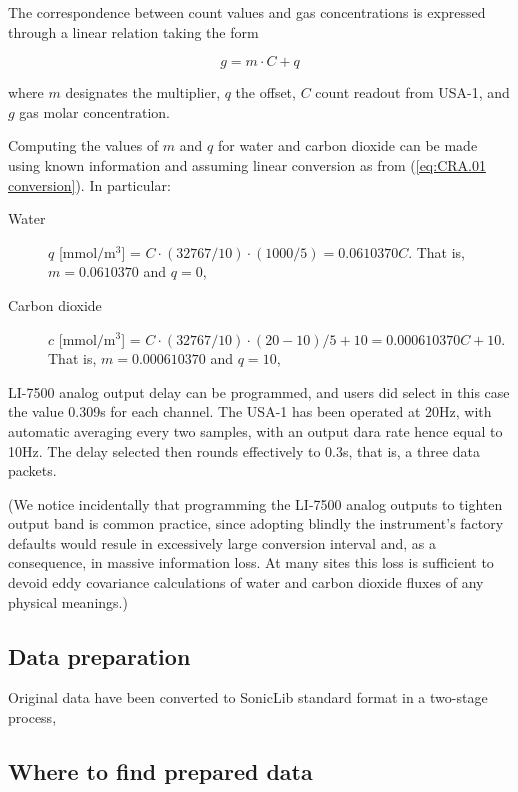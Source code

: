 \documentclass[a4paper,10pt]{book}
\begin{document}
The correspondence between count values and gas concentrations is expressed through a linear relation taking the form

\begin{equation}\label{eq:CRA.01 conversion}
 g = m \cdot C + q
\end{equation} 

\noindent where $m$ designates the multiplier, $q$ the offset, $C$ count readout from USA-1, and $g$ gas molar concentration.

Computing the values of $m$ and $q$ for water and carbon dioxide can be made using known information and assuming linear conversion as from (\ref{eq:CRA.01 conversion}). In particular:

\begin{description}
 \item[Water] $q$ [$\mbox{mmol}/\mbox{m}^3$] = $C \cdot (32767/10) \cdot (1000/5) = 0.0610370 C$. That is, $m=0.0610370$ and $q=0$,
 \item[Carbon dioxide] $c$ [$\mbox{mmol}/\mbox{m}^3$] = $C \cdot (32767/10) \cdot (20-10)/5 + 10 = 0.000610370 C + 10$. That is, $m=0.000610370$ and $q=10$,
\end{description}

LI-7500 analog output delay can be programmed, and users did select in this case the value 0.309s for each channel. The USA-1 has been operated at 20Hz, with automatic averaging every two samples, with an output dara rate hence equal to 10Hz. The delay selected then rounds effectively to 0.3s, that is, a three data packets.

(We notice incidentally that programming the LI-7500 analog outputs to tighten output band is common practice, since adopting blindly the instrument's factory defaults would resule in excessively large conversion interval and, as a consequence, in massive information loss. At many sites this loss is sufficient to devoid eddy covariance calculations of water and carbon dioxide fluxes of any physical meanings.)

\subsection{Data preparation}

Original data have been converted to SonicLib standard format in a two-stage process, 

\subsection{Where to find prepared data}
\end{document}
